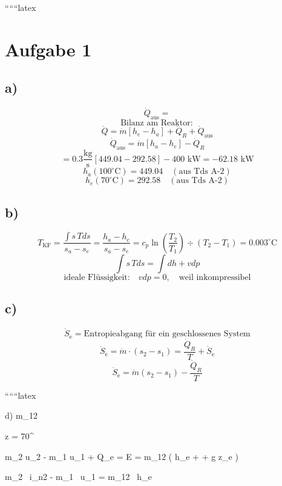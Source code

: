 
``````latex

\section*{Aufgabe 1}

\subsection*{a)}
\[
\dot{Q}_{\text{aus}} = 
\]
\[
\text{Bilanz am Reaktor}:
\]
\[
\dot{Q} = \dot{m} \left[ h_e - h_a \right] + \dot{Q}_R + \dot{Q}_{\text{aus}}
\]
\[
\dot{Q}_{\text{aus}} = \dot{m} \left[ h_a - h_e \right] - \dot{Q}_R
\]
\[
= 0.3 \frac{\text{kg}}{\text{s}} \left[ 449.04 - 292.58 \right] - 400 \text{ kW} = -62.18 \text{ kW}
\]
\[
h_a (100^\circ \text{C}) = 449.04 \quad (\text{aus Tds A-2})
\]
\[
h_e (70^\circ \text{C}) = 292.58 \quad (\text{aus Tds A-2})
\]

\subsection*{b)}
\[
T_{\text{KF}} = \frac{\int s \, T ds}{s_a - s_e} = \frac{h_a - h_e}{s_a - s_e} = c_p \ln \left( \frac{T_2}{T_1} \right) \div (T_2 - T_1) = 0.003^\circ \text{C}
\]
\[
\int s \, T ds = \int dh + v dp
\]
\[
\text{ideale Flüssigkeit:} \quad v dp = 0, \quad \text{weil inkompressibel}
\]

\subsection*{c)}
\[
\dot{S}_{\text{e}} = \text{Entropieabgang für ein geschlossenes System}
\]
\[
\dot{S}_{\text{e}} = \dot{m} \cdot (s_2 - s_1) = \frac{\dot{Q}_R}{T} + \dot{S}_{\text{e}}
\]
\[
\dot{S}_{\text{e}} = \dot{m} (s_2 - s_1) - \frac{\dot{Q}_R}{T}
\]

``````latex


d) \quad {} \quad \Delta m_{12}

 \quad z = 70^\circ

\Rightarrow {} 


m_2 u_2 - m_1 u_1 + \Delta Q_e = \Delta E = \Delta m_{12} \left( h_e +  + g z_e \right)

 \quad {}

m_2 \, i_{n2} - m_1 \, u_1 = \Delta m_{12} \, h_e

